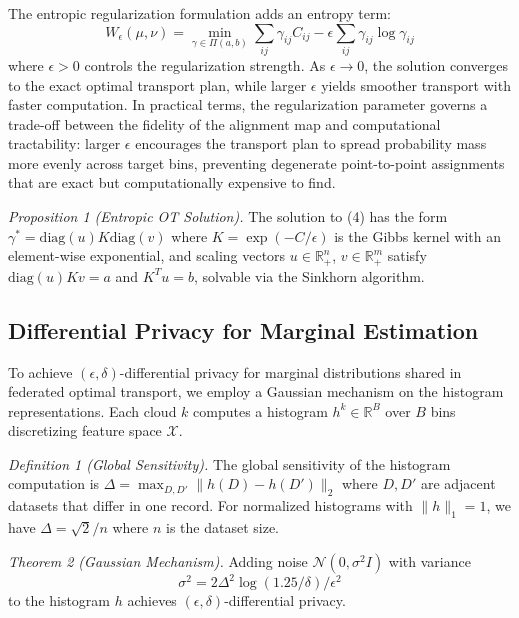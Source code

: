 \documentclass{ieeeaccess}
\theoremstyle{plain}
\theoremstyle{definition}
\theoremstyle{remark}
\begin{document}
The entropic regularization formulation adds an entropy term:
\begin{equation}
W_\epsilon(\mu, \nu) = \min_{\gamma \in \Pi(a,b)} \sum_{ij} \gamma_{ij} C_{ij} - \epsilon \sum_{ij} \gamma_{ij} \log \gamma_{ij}
\end{equation}
where $\epsilon > 0$ controls the regularization strength. As $\epsilon \to 0$, the solution converges to the exact optimal transport plan, while larger $\epsilon$ yields smoother transport with faster computation. In practical terms, the regularization parameter governs a trade-off between the fidelity of the alignment map and computational tractability: larger $\epsilon$ encourages the transport plan to spread probability mass more evenly across target bins, preventing degenerate point-to-point assignments that are exact but computationally expensive to find.

\textit{Proposition 1 (Entropic OT Solution).} The solution to (4) has the form $\gamma^* = \text{diag}(u)K\text{diag}(v)$ where $K = \exp(-C/\epsilon)$ is the Gibbs kernel with an element-wise exponential, and scaling vectors $u \in \mathbb{R}_+^n$, $v \in \mathbb{R}_+^m$ satisfy $\text{diag}(u)Kv = a$ and $K^T u = b$, solvable via the Sinkhorn algorithm.

\subsection{Differential Privacy for Marginal Estimation}

To achieve $(\epsilon, \delta)$-differential privacy for marginal distributions shared in federated optimal transport, we employ a Gaussian mechanism on the histogram representations. Each cloud $k$ computes a histogram $h^k \in \mathbb{R}^B$ over $B$ bins discretizing feature space $\mathcal{X}$.

\textit{Definition 1 (Global Sensitivity).} The global sensitivity of the histogram computation is $\Delta = \max_{D,D'} \|h(D)-h(D')\|_2$ where $D, D'$ are adjacent datasets that differ in one record. For normalized histograms with $\|h\|_1 = 1$, we have $\Delta = \sqrt{2}/n$ where $n$ is the dataset size.

\textit{Theorem 2 (Gaussian Mechanism).} Adding noise $\mathcal{N}(0, \sigma^2 I)$ with variance
\begin{equation}
\sigma^2 = 2\Delta^2 \log(1.25/\delta)/\epsilon^2
\end{equation}
to the histogram $h$ achieves $(\epsilon, \delta)$-differential privacy.
\end{document}
